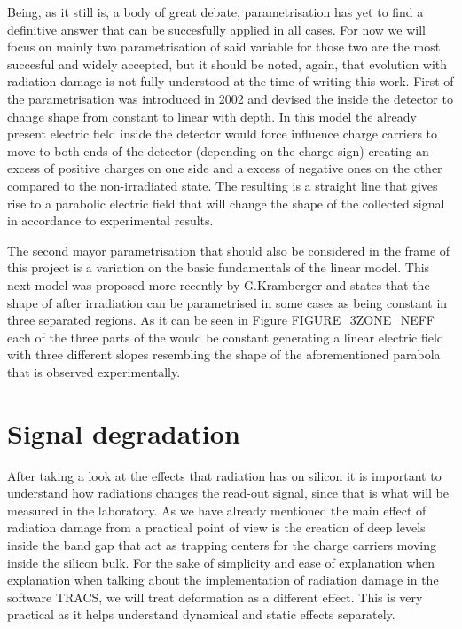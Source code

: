 Being, as it still is, a body of great debate, \neff parametrisation has yet to find a definitive answer that can be succesfully applied in all cases. For now we will focus on mainly two parametrisation of said variable for those two are the most succesful and widely accepted, but it should be noted, again, that \neff evolution with radiation damage is not fully understood at the time of writing this work. First of the parametrisation was introduced in 2002 and devised the \neff inside the detector to change shape from constant to linear with depth. In this model the already present electric field inside the detector would force influence charge carriers to move to both ends of the detector (depending on the charge sign) creating an excess of positive charges on one side and a excess of negative ones on the other compared to the non-irradiated state. The resulting \neff is a straight line that gives rise to a parabolic electric field that will change the shape of the collected signal in accordance to experimental results.

The second mayor parametrisation that should also be considered in the frame of this project is a variation on the basic fundamentals of the linear model. This next model was proposed more recently by G.Kramberger and states that the shape of \neff after irradiation can be parametrised in some cases as being constant in three separated regions. As it can be seen in Figure FIGURE\_3ZONE\_NEFF each of the three parts of the \neff would be constant generating a linear electric field with three different slopes resembling the shape of the aforementioned parabola that is observed experimentally.


\section{Signal degradation}

After taking a look at the effects that radiation has on silicon it is important to understand how radiations changes the read-out signal, since that is what will be measured in the laboratory. As we have already mentioned the main effect of radiation damage from a practical point of view is the creation of deep levels inside the band gap that act as trapping centers for the charge carriers moving inside the silicon bulk. For the sake of simplicity and ease of explanation when explanation when talking about the implementation of radiation damage in the software TRACS, we will treat \neff deformation as a different effect. This is very practical as it helps understand dynamical and static effects separately. 

